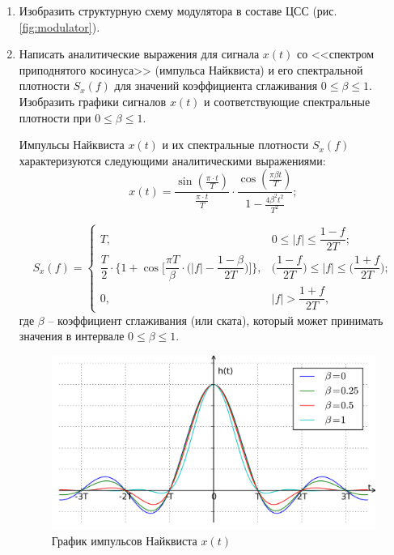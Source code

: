 \documentclass[a4paper, 12pt]{article}
\begin{document}
\begin{enumerate}
  \item Изобразить структурную схему модулятора в составе ЦСС 
  (рис. \ref{fig:modulator}).

  \item Написать аналитические выражения для сигнала $x(t)$ 
  со <<спектром приподнятого косинуса>> (импульса Найквиста) 
  и его спектральной плотности $S_x(f)$ для значений коэффициента 
  сглаживания $0\leq \beta \leq 1$. Изобразить графики сигналов 
  $x(t)$ и соответствующие спектральные плотности 
  при $0\leq \beta \leq 1$.

  Импульсы Найквиста $x(t)$ и их спектральные плотности $S_x(f)$
  характеризуются следующими аналитическими выражениями:
  \begin{equation} \label{eq:imp_niq}
    x(t)=\frac{\sin(\frac{\pi\cdot t}{T})}{\frac{\pi\cdot t}{T}}
    \cdot\frac{\cos(\frac{\pi\beta t}{T})}{1-\frac{4\beta^2 t^2}{T^2}}; 
  \end{equation}

  \begin{equation}  
    S_x(f)=\begin{cases}
      T, & 0\leq |f|\leq\dfrac{1-f}{2T};\\[10pt]
      \dfrac{T}{2}\cdot\biggr\{1+\cos\biggr[\dfrac{\pi T}{\beta}
      \cdot\biggr(|f|-\dfrac{1-\beta}{2T}\biggr)\biggr]\biggr\}, &
      \biggr(\dfrac{1-f}{2T}\biggr)\leq|f|\leq 
      \biggr(\dfrac{1+f}{2T}\biggr);\\[10pt]
      0, & |f|>\dfrac{1+f}{2T},
    \end{cases}
  \end{equation}
  где $\beta$ -- коэффициент сглаживания (или ската), который 
  может принимать значения в интервале $0\leq \beta \leq 1$.

  \begin{figure}[H]
    \centering
    \includegraphics[scale=0.13]{Raised-cosine-impulse}
    \caption{График импульсов Найквиста $x(t)$} 
    \label{fig:imp_niq}
  \end{figure}


\end{enumerate}
\end{document}
